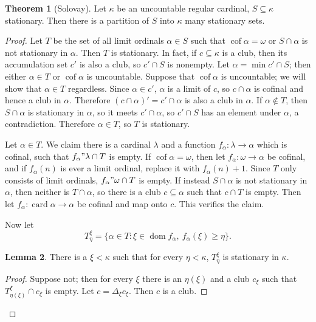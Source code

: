\documentclass[12pt]{report}
\newcommand{\card}{\operatorname{card}}
\DeclareMathOperator{\cof}{cof}
\DeclareMathOperator{\dom}{dom}
\theoremstyle{definition}
\newtheorem{theorem}{Theorem}[chapter]
\newtheorem{lemma}[theorem]{Lemma}
\begin{document}
\begin{theorem}[Solovay]
\label{solovay stationary theorem}
Let $\kappa$ be an uncountable regular cardinal, $S \subseteq \kappa$ stationary. Then there is a partition of $S$ into $\kappa$ many stationary sets.
\end{theorem}
\begin{proof}
Let $T$ be the set of all limit ordinals $\alpha \in S$ such that $\cof \alpha = \omega$ or $S \cap \alpha$ is not stationary in $\alpha$.
Then $T$ is stationary. In fact, if $c \subseteq \kappa$ is a club, then its accumulation set $c'$ is also a club, so $c' \cap S$ is nonempty.
Let $\alpha = \min c' \cap S$; then either $\alpha \in T$ or $\cof \alpha$ is uncountable.
Suppose that $\cof \alpha$ is uncountable; we will show that $\alpha \in T$ regardless. Since $\alpha \in c'$, $\alpha$ is a limit of $c$,
so $c \cap \alpha$ is cofinal and hence a club in $\alpha$. Therefore $(c \cap \alpha)' = c' \cap \alpha$ is also a club in $\alpha$.
If $\alpha \notin T$, then $S \cap \alpha$ is stationary in $\alpha$, so it meets $c' \cap \alpha$, so $c' \cap S$ has an element under $\alpha$, a contradiction.
Therefore $\alpha \in T$, so $T$ is stationary.

Let $\alpha \in T$. We claim there is a cardinal $\lambda$ and a function $f_\alpha: \lambda \to \alpha$ which is cofinal, such that $f_\alpha"\lambda \cap T$ is empty.
If $\cof \alpha = \omega$, then let $f_\alpha: \omega \to \alpha$ be cofinal, and if $f_\alpha(n)$ is ever a limit ordinal, replace it with $f_\alpha(n) + 1$. Since $T$ only consists of limit ordinals, $f_\alpha"\omega \cap T$ is empty.
If instead $S \cap \alpha$ is not stationary in $\alpha$, then neither is $T \cap \alpha$, so there is a club $c \subseteq \alpha$ such that $c \cap T$ is empty. Then let $f_\alpha: \card \alpha \to \alpha$ be cofinal and map onto $c$.
This verifies the claim.

Now let
$$T_\eta^\xi = \{\alpha \in T: \xi \in \dom f_\alpha, ~f_\alpha(\xi) \geq \eta\}.$$
\begin{lemma}
There is a $\xi < \kappa$ such that for every $\eta < \kappa$, $T_\eta^\xi$ is stationary in $\kappa$.
\end{lemma}
\begin{proof}
Suppose not; then for every $\xi$ there is an $\eta(\xi)$ and a club $c_\xi$ such that $T_{\eta(\xi)}^\xi \cap c_\xi$ is empty.
Let $c = \Delta_\xi c_\xi$. Then $c$ is a club.


\end{proof}
\end{proof}
\end{document}
